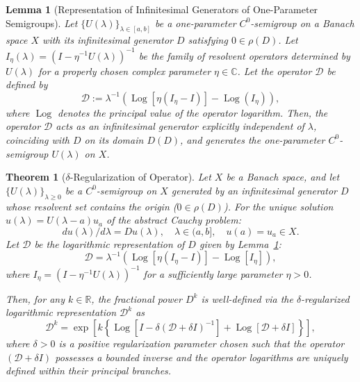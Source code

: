 \documentclass[10pt,a4paper]{amsart}
\newtheorem{lemma}{Lemma}
\newtheorem{theorem}{Theorem}
\begin{document}
\begin{lemma}[Representation of Infinitesimal Generators of One-Parameter Semigroups] \label{lem03}
Let $\{U(\lambda)\}_{\lambda \in [a, b]}$ be a one-parameter $C^0$-semigroup on a Banach space $X$ with its infinitesimal generator $D$ satisfying $0 \in \rho(D)$. 
Let $I_{\eta}(\lambda) = (I - \eta^{-1}U(\lambda))^{-1}$ be the family of resolvent operators determined by $U(\lambda)$ for a properly chosen complex parameter $\eta \in \mathbb{C}$. 
Let the operator $\mathcal{D}$ be defined by
\begin{equation} \label{eq-simp01}
\mathcal{D} := \lambda^{-1} \left( \operatorname{Log}[\eta(I_{\eta}-I)] - \operatorname{Log}(I_{\eta}) \right),
\end{equation}
where $\operatorname{Log}$ denotes the principal value of the operator logarithm. 
Then, the operator $\mathcal{D}$ acts as an infinitesimal generator explicitly independent of $\lambda$, coinciding with $D$ on its domain $D(D)$, and generates the one-parameter $C^0$-semigroup $U(\lambda)$ on $X$.
\end{lemma}

\begin{theorem} [$\delta$-Regularization of Operator] \label{thm-01}
Let $X$ be a Banach space, and let $\{U(\lambda)\}_{\lambda \ge 0}$ be a $C^0$-semigroup on $X$ generated by an infinitesimal generator $D$ whose resolvent set contains the origin ($0 \in \rho(D)$). 
For the unique solution $u(\lambda) = U(\lambda-a)u_a$ of the abstract Cauchy problem:
\begin{equation} \label{cauchy-main}
d u(\lambda) /d \lambda  = Du(\lambda), \quad \lambda \in (a, b], 
\quad  u(a) = u_a \in X. 
\end{equation}
Let $\mathcal{D}$ be the logarithmic representation of $D$ given by Lemma~\ref{lem03}:
\[
\mathcal{D} = \lambda^{-1} \left( \operatorname{Log}[\eta(I_{\eta}-I)] - \operatorname{Log}[I_{\eta}] \right),
\]
where $I_{\eta} = (I - \eta^{-1} U(\lambda))^{-1}$ for a sufficiently large parameter $\eta > 0$.

Then, for any $k \in \mathbb{R}$, the fractional power $D^k$ is well-defined via the $\delta$-regularized logarithmic representation $\mathcal{D}^k$ as
\begin{equation} \label{fractional-def}
\mathcal{D}^k = \exp \left[ k \left\{ \operatorname{Log} \left[ I - \delta (\mathcal{D} + \delta I)^{-1} \right] + \operatorname{Log} [\mathcal{D} + \delta I] \right\} \right],
\end{equation}
where $\delta > 0$ is a positive regularization parameter chosen such that the operator $(\mathcal{D} + \delta I)$ possesses a bounded inverse and the operator logarithms are uniquely defined within their principal branches.
\end{theorem}
\end{document}
